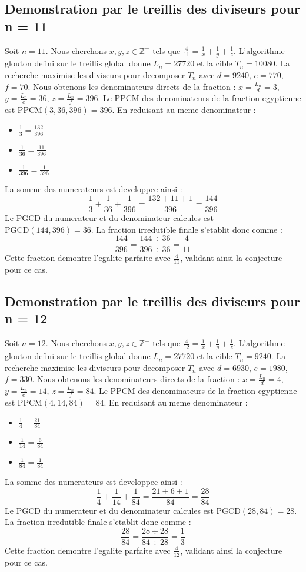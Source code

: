 \documentclass[11pt,a4paper]{article}
\begin{document}
\subsection{Demonstration par le treillis des diviseurs pour n = 11}
Soit $n = 11$. Nous cherchons $x, y, z \in \mathbb{Z}^{+}$ tels que $\frac{4}{11} = \frac{1}{x} + \frac{1}{y} + \frac{1}{z}$.
L'algorithme glouton defini sur le treillis global donne $L_n = 27720$ et la cible $T_n = 10080$.
La recherche maximise les diviseurs pour decomposer $T_n$ avec $d = 9240$, $e = 770$, $f = 70$.
Nous obtenons les denominateurs directs de la fraction : $x = \frac{L_n}{d} = 3$, $y = \frac{L_n}{e} = 36$, $z = \frac{L_n}{f} = 396$.
Le PPCM des denominateurs de la fraction egyptienne est $\text{PPCM}(3, 36, 396) = 396$.
En reduisant au meme denominateur :
\begin{itemize}
    \item $\frac{1}{3} = \frac{132}{396}$
    \item $\frac{1}{36} = \frac{11}{396}$
    \item $\frac{1}{396} = \frac{1}{396}$
\end{itemize}
La somme des numerateurs est developpee ainsi :
$$ \frac{1}{3} + \frac{1}{36} + \frac{1}{396} = \frac{132 + 11 + 1}{396} = \frac{144}{396} $$
Le PGCD du numerateur et du denominateur calcules est $\text{PGCD}(144, 396) = 36$.
La fraction irredutible finale s'etablit donc comme :
$$ \frac{144}{396} = \frac{144 \div 36}{396 \div 36} = \frac{4}{11} $$
Cette fraction demontre l'egalite parfaite avec $\frac{4}{11}$, validant ainsi la conjecture pour ce cas.

\subsection{Demonstration par le treillis des diviseurs pour n = 12}
Soit $n = 12$. Nous cherchons $x, y, z \in \mathbb{Z}^{+}$ tels que $\frac{4}{12} = \frac{1}{x} + \frac{1}{y} + \frac{1}{z}$.
L'algorithme glouton defini sur le treillis global donne $L_n = 27720$ et la cible $T_n = 9240$.
La recherche maximise les diviseurs pour decomposer $T_n$ avec $d = 6930$, $e = 1980$, $f = 330$.
Nous obtenons les denominateurs directs de la fraction : $x = \frac{L_n}{d} = 4$, $y = \frac{L_n}{e} = 14$, $z = \frac{L_n}{f} = 84$.
Le PPCM des denominateurs de la fraction egyptienne est $\text{PPCM}(4, 14, 84) = 84$.
En reduisant au meme denominateur :
\begin{itemize}
    \item $\frac{1}{4} = \frac{21}{84}$
    \item $\frac{1}{14} = \frac{6}{84}$
    \item $\frac{1}{84} = \frac{1}{84}$
\end{itemize}
La somme des numerateurs est developpee ainsi :
$$ \frac{1}{4} + \frac{1}{14} + \frac{1}{84} = \frac{21 + 6 + 1}{84} = \frac{28}{84} $$
Le PGCD du numerateur et du denominateur calcules est $\text{PGCD}(28, 84) = 28$.
La fraction irredutible finale s'etablit donc comme :
$$ \frac{28}{84} = \frac{28 \div 28}{84 \div 28} = \frac{1}{3} $$
Cette fraction demontre l'egalite parfaite avec $\frac{4}{12}$, validant ainsi la conjecture pour ce cas.
\end{document}
